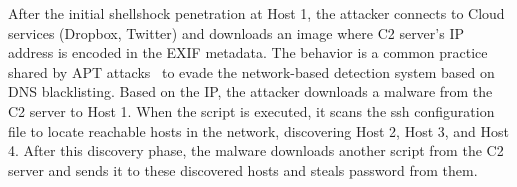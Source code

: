After the initial shellshock penetration at Host 1, the attacker connects to Cloud services (\eg Dropbox, Twitter) and downloads an image where C2 server's IP address is encoded in the EXIF metadata. 
The behavior is a common practice shared by APT attacks~\cite{hammertoss,vpnfilter} to evade the network-based detection system based on DNS blacklisting. 
Based on the IP, the attacker downloads a malware from the C2 server to Host 1. 
When the script is executed, it scans the ssh configuration file to locate reachable hosts in the network, discovering Host 2, Host 3, and Host 4.
After this discovery phase, the malware downloads another script from the C2 server and sends it to these discovered hosts and steals password from them. 


